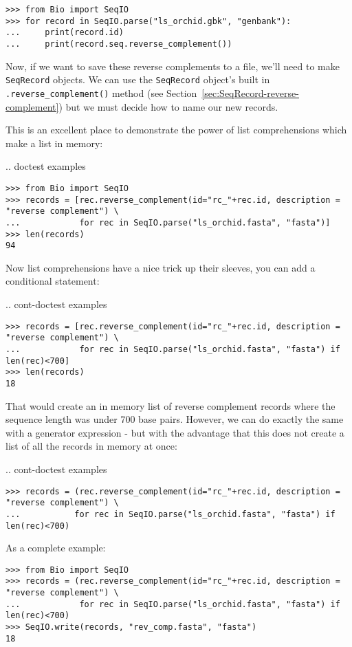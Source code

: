 \begin{verbatim}
>>> from Bio import SeqIO
>>> for record in SeqIO.parse("ls_orchid.gbk", "genbank"):
...     print(record.id)
...     print(record.seq.reverse_complement())
\end{verbatim}

Now, if we want to save these reverse complements to a file, we'll need to make \verb|SeqRecord| objects.
We can use  the \verb|SeqRecord| object's built in \verb|.reverse_complement()| method (see Section~\ref{sec:SeqRecord-reverse-complement}) but we must decide how to name our new records.

This is an excellent place to demonstrate the power of list comprehensions which make a list in memory:

\pandocignoreme .. doctest examples
\begin{verbatim}
>>> from Bio import SeqIO
>>> records = [rec.reverse_complement(id="rc_"+rec.id, description = "reverse complement") \
...            for rec in SeqIO.parse("ls_orchid.fasta", "fasta")]
>>> len(records)
94
\end{verbatim}

\noindent Now list comprehensions have a nice trick up their sleeves, you can add a conditional statement:

\pandocignoreme .. cont-doctest examples
\begin{verbatim}
>>> records = [rec.reverse_complement(id="rc_"+rec.id, description = "reverse complement") \
...            for rec in SeqIO.parse("ls_orchid.fasta", "fasta") if len(rec)<700]
>>> len(records)
18
\end{verbatim}

That would create an in memory list of reverse complement records where the sequence length was under 700 base pairs. However, we can do exactly the same with a generator expression - but with the advantage that this does not create a list of all the records in memory at once:

\pandocignoreme .. cont-doctest examples
\begin{verbatim}
>>> records = (rec.reverse_complement(id="rc_"+rec.id, description = "reverse complement") \
...           for rec in SeqIO.parse("ls_orchid.fasta", "fasta") if len(rec)<700)
\end{verbatim}

As a complete example:

\begin{verbatim}
>>> from Bio import SeqIO
>>> records = (rec.reverse_complement(id="rc_"+rec.id, description = "reverse complement") \
...            for rec in SeqIO.parse("ls_orchid.fasta", "fasta") if len(rec)<700)
>>> SeqIO.write(records, "rev_comp.fasta", "fasta")
18
\end{verbatim}

